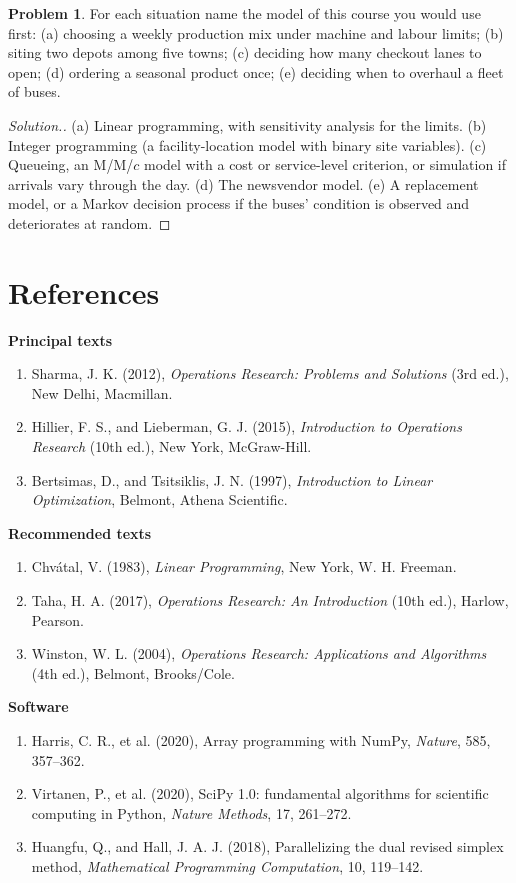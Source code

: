 \documentclass[11pt,a4paper]{article}
\numberwithin{equation}{section}
\theoremstyle{definition}
\newtheorem{problemx}{Problem}[subsection]
\newenvironment{problem}{\begin{problemx}}{\end{problemx}}
\newenvironment{solution}
  {\renewcommand{\qedsymbol}{}\begin{proof}[\textit{Solution}.]}
  {\end{proof}}
\newcommand{\subhead}[1]{%
  \par\medskip\noindent\textbf{#1}\par\nobreak\smallskip}
\begin{document}
\begin{problem}
For each situation name the model of this course you would use first: (a) choosing a weekly production mix under machine and labour limits; (b) siting two depots among five towns; (c) deciding how many checkout lanes to open; (d) ordering a seasonal product once; (e) deciding when to overhaul a fleet of buses.
\end{problem}

\begin{solution}
(a) Linear programming, with sensitivity analysis for the limits. (b) Integer programming (a facility-location model with binary site variables). (c) Queueing, an M/M/$c$ model with a cost or service-level criterion, or simulation if arrivals vary through the day. (d) The newsvendor model. (e) A replacement model, or a Markov decision process if the buses'
condition is observed and deteriorates at random.
\end{solution}


\section*{References}
\sloppy

\subhead{Principal texts}
\begin{enumerate}
\item Sharma, J. K. (2012), \emph{Operations Research: Problems and Solutions} (3rd ed.), New Delhi, Macmillan.
\item Hillier, F. S., and Lieberman, G. J. (2015), \emph{Introduction to Operations Research} (10th ed.), New York, McGraw-Hill.
\item Bertsimas, D., and Tsitsiklis, J. N. (1997), \emph{Introduction to Linear Optimization}, Belmont, Athena Scientific.
\end{enumerate}

\subhead{Recommended texts}
\begin{enumerate}
\item Chv\'atal, V. (1983), \emph{Linear Programming}, New York, W. H. Freeman.
\item Taha, H. A. (2017), \emph{Operations Research: An Introduction} (10th ed.), Harlow, Pearson.
\item Winston, W. L. (2004), \emph{Operations Research: Applications and Algorithms} (4th ed.), Belmont, Brooks/Cole.
\end{enumerate}

\subhead{Software}
\begin{enumerate}
\item Harris, C. R., et al. (2020), Array programming with NumPy, \emph{Nature}, 585, 357--362.
\item Virtanen, P., et al. (2020), SciPy 1.0: fundamental algorithms for scientific computing in Python, \emph{Nature Methods}, 17, 261--272.
\item Huangfu, Q., and Hall, J. A. J. (2018), Parallelizing the dual revised simplex method, \emph{Mathematical Programming Computation}, 10, 119--142.
\end{enumerate}
\end{document}
